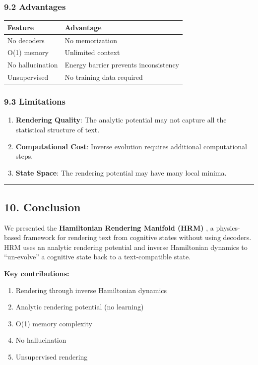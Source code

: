 \documentclass[
  11pt,
  a4paper,
]{article}
\providecommand{\tightlist}{%
  \setlength{\itemsep}{0pt}\setlength{\parskip}{0pt}}
\begin{document}
\subsubsection{9.2 Advantages}\label{advantages}

\begin{longtable}[]{@{}ll@{}}
\toprule\noalign{}
Feature & Advantage \\
\midrule\noalign{}
\endhead
\bottomrule\noalign{}
\endlastfoot
No decoders & No memorization \\
O(1) memory & Unlimited context \\
No hallucination & Energy barrier prevents inconsistency \\
Unsupervised & No training data required \\
\end{longtable}

\subsubsection{9.3 Limitations}\label{limitations}

\begin{enumerate}
\def\labelenumi{\arabic{enumi}.}
\tightlist
\item
  \textbf{Rendering Quality}: The analytic potential may not capture all
  the statistical structure of text.
\item
  \textbf{Computational Cost}: Inverse evolution requires additional
  computational steps.
\item
  \textbf{State Space}: The rendering potential may have many local
  minima.
\end{enumerate}

\begin{center}\rule{0.5\linewidth}{0.5pt}\end{center}

\subsection{10. Conclusion}\label{conclusion}

We presented the \textbf{Hamiltonian Rendering Manifold (HRM)} , a
physics-based framework for rendering text from cognitive states without
using decoders. HRM uses an analytic rendering potential and inverse
Hamiltonian dynamics to ``un-evolve'' a cognitive state back to a
text-compatible state.

\textbf{Key contributions:}

\begin{enumerate}
\def\labelenumi{\arabic{enumi}.}
\tightlist
\item
  Rendering through inverse Hamiltonian dynamics
\item
  Analytic rendering potential (no learning)
\item
  O(1) memory complexity
\item
  No hallucination
\item
  Unsupervised rendering
\end{enumerate}
\end{document}
